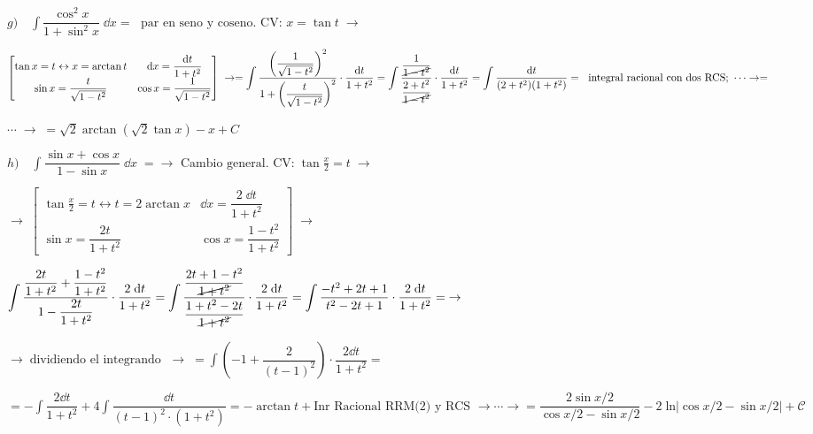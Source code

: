 {\begin{proofw}
\vspace{4mm}
$g) \quad \displaystyle \int \dfrac {\cos^2 x}{1+\sin^2 x} \; \dd x = \; \text { par en seno y coseno. CV: } x=\tan t \; \to $

$ \left[ \begin{matrix} \tan x = t \leftrightarrow x=\arctan t & \dd x= \dfrac {\dd t}{1+t^2} \\  
\sin x = \dfrac {t}{\sqrt{1-t^2}} & \cos x = \dfrac {1}{\sqrt{1-t^2}}
\end{matrix} \right] \; \to = \displaystyle \int  
\dfrac
{ \left( \dfrac {1}{\sqrt{1-t^2}}   \right)^2}
{ 1 + \left(  \dfrac {t}{\sqrt{1-t^2}}  \right)^2  }\cdot \dfrac {\dd t}{1+t^2} = \displaystyle \int  
 \dfrac {\dfrac {1}{\cancel{1-t^2}}}{\dfrac {2+t^2 }{\cancel{1-t^2}}}\cdot \dfrac {\dd t}{1+t^2} = \int \dfrac {\dd t}{(2+t^2)(1+t^2)}= \; \text{ integral racional con dos RCS; }\cdots \to = $
 
 $\cdots \; \to \; =\sqrt{2} \arctan (\sqrt{2} \tan x)-x + C$



\vspace{4mm}
$h) \quad \displaystyle \int \dfrac {\sin x + \cos x}{1-\sin x} \; \dd x \; = \to \text { Cambio general. CV:}\; \tan \frac x 2 = t \; \to \; $	

$\to \; \left[ \begin{matrix}
 \tan \frac x 2 = t \leftrightarrow t= 2 \arctan x & \dd x = \dfrac {2 \; \dd t}{1+t^2}        \\  
 \sin x = \dfrac {2t}{1+t^2} & \cos x = \dfrac {1-t^2}{1+t^2}        
 \end{matrix} \right] \; \to $ 
 
 $\displaystyle \int \dfrac {\dfrac {2t }{1+t^2}+\dfrac {1-t^2}{1+t^2}}{1-\dfrac {2t}{1+t^2}} \cdot \dfrac {2 \; \dd t}{1+t^2} =\displaystyle \int \dfrac {\dfrac {2t+1-t^2}{\cancel{1+t^2}}}{\dfrac {1+t^2-2t}{\cancel{1+t^2}}} 
 \cdot \dfrac {2 \; \dd t}{1+t^2} =\displaystyle \int \dfrac {-t^2+2t+1}{t^2-2t+1} \cdot \dfrac {2 \; \dd t}{1+t^2} = \; \to $
 
 $\to\; \text {dividiendo el integrando } \; \to \; = \displaystyle \int \left( -1 + \dfrac {2}{ (t-1)^2}  \right) \cdot \dfrac {2\dd t}{1+t^2} = $
 
$=  -\int \dfrac {2 \dd t}{ 1+t^2} + 4 \int \dfrac {\dd t} {(t-1)^2 \cdot  (1+t^2)} = - \arctan t + \text {Inr Racional RRM(2) y RCS } \to \cdots \to =  \dfrac {2 \sin x/2}{\cos x/2 - \sin x/2}-2\; \mathrm{ln} \left|\cos x/2 - \sin x/2  \right| +\mathcal C$


\end{proofw}}

